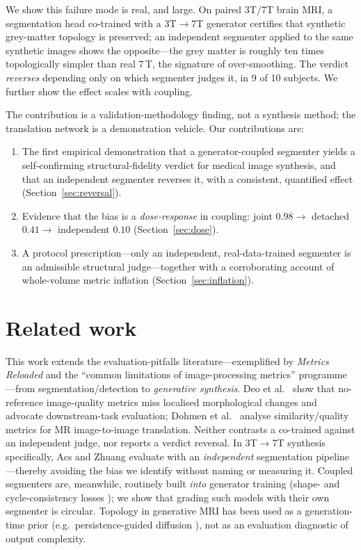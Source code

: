 \documentclass[11pt,a4paper]{article}
\begin{document}
We show this failure mode is real, and large. On paired 3T/7T brain MRI, a segmentation head
co-trained with a 3T$\rightarrow$7T generator certifies that synthetic grey-matter topology is
preserved; an independent segmenter applied to the same synthetic images shows the opposite---the
grey matter is roughly ten times topologically simpler than real 7\,T, the signature of
over-smoothing. The verdict \emph{reverses} depending only on which segmenter judges it, in 9 of
10 subjects. We further show the effect scales with coupling.

The contribution is a validation-methodology finding, not a synthesis method; the translation
network is a demonstration vehicle. Our contributions are:
\begin{enumerate}
\item The first empirical demonstration that a generator-coupled segmenter yields a
self-confirming structural-fidelity verdict for medical image synthesis, and that an independent
segmenter reverses it, with a consistent, quantified effect (Section~\ref{sec:reversal}).
\item Evidence that the bias is a \emph{dose-response} in coupling: joint $0.98\rightarrow$
detached $0.41\rightarrow$ independent $0.10$ (Section~\ref{sec:dose}).
\item A protocol prescription---only an independent, real-data-trained segmenter is an admissible
structural judge---together with a corroborating account of whole-volume metric inflation
(Section~\ref{sec:inflation}).
\end{enumerate}

\section{Related work}
This work extends the evaluation-pitfalls literature---exemplified by \emph{Metrics Reloaded}
\cite{maierhein2024metricsreloaded} and the ``common limitations of image-processing metrics''
programme---from segmentation/detection to \emph{generative synthesis}. Deo et al.\
\cite{deo2025metrics} show that no-reference image-quality metrics miss localised morphological
changes and advocate downstream-task evaluation; Dohmen et al.\ \cite{dohmen2025similarity}
analyse similarity/quality metrics for MR image-to-image translation. Neither contrasts a
co-trained against an independent judge, nor reports a verdict reversal. In 3T$\rightarrow$7T
synthesis specifically, Acs and Zhuang \cite{acs2025semisupervised} evaluate with an
\emph{independent} segmentation pipeline---thereby avoiding the bias we identify without naming or
measuring it. Coupled segmenters are, meanwhile, routinely built \emph{into} generator training
(shape- and cycle-consistency losses \cite{zhang2018translating}); we show that grading such models
with their own segmenter is circular. Topology in generative MRI has been used as a
generation-time prior (e.g.\ persistence-guided diffusion \cite{bhattacharya2025brainmrdiff}),
not as an evaluation diagnostic of output complexity.
\end{document}
